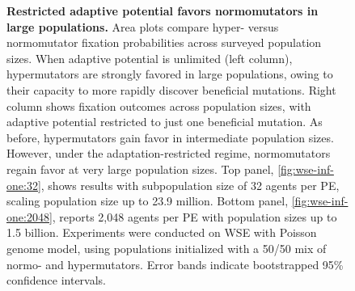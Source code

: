 \begin{figure}[h]
\begin{minipage}{0.7\textwidth}
  \end{minipage}%
  \begin{minipage}{0.3\textwidth}
    \caption{%
      \textbf{Restricted adaptive potential favors normomutators in large populations.}
      \footnotesize
      Area plots compare hyper- versus normomutator fixation probabilities across surveyed population sizes.
      When adaptive potential is unlimited (left column), hypermutators are strongly favored in large populations, owing to their capacity to more rapidly discover beneficial mutations.
      Right column shows fixation outcomes across population sizes, with adaptive potential restricted to just one beneficial mutation.
      As before, hypermutators gain favor in intermediate population sizes.
      However, under the adaptation-restricted regime, normomutators regain favor at very large population sizes.
      Top panel, \ref{fig:wse-inf-one:32}, shows results with subpopulation size of 32 agents per PE, scaling population size up to 23.9 million.
      Bottom panel, \ref{fig:wse-inf-one:2048}, reports 2,048 agents per PE with population sizes up to 1.5 billion.
      Experiments were conducted on WSE with Poisson genome model, using populations initialized with a 50/50 mix of normo- and hypermutators.
      Error bands indicate bootstrapped 95\% confidence intervals.
    }
    \label{fig:wse-inf-one}
  \end{minipage}
\end{figure}
